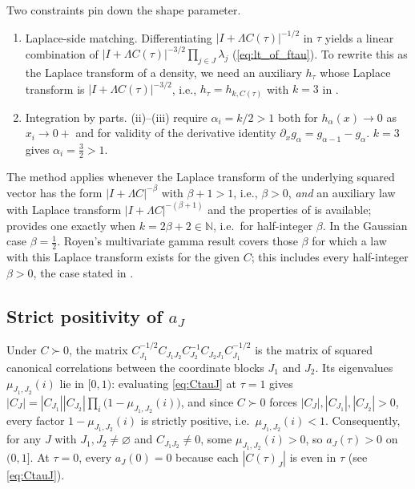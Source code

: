 \documentclass[12pt,a4paper]{article}
\theoremstyle{definition}
\begin{document}
Two constraints pin down the shape parameter.
\begin{enumerate}
  \item Laplace-side matching.  Differentiating
    $|I+\Lambda C(\tau)|^{-1/2}$ in $\tau$ yields a linear combination
    of $|I+\Lambda C(\tau)|^{-3/2}\prod_{j\in J}\lambda_j$
    (\eqref{eq:lt_of_ftau}).  To rewrite this as the Laplace transform
    of a density, we need an auxiliary $h_\tau$ whose Laplace
    transform is $|I+\Lambda C(\tau)|^{-3/2}$, i.e.,
    $h_\tau=h_{k,C(\tau)}$ with $k=3$ in .

  \item Integration by parts.  (ii)--(iii) require
    $\alpha_i=k/2>1$ both for $h_\alpha(x)\to 0$ as $x_i\to 0+$ and for
    validity of the derivative identity
    $\partial_xg_\alpha=g_{\alpha-1}-g_\alpha$.  $k=3$ gives
    $\alpha_i=\tfrac{3}{2}>1$.
\end{enumerate}

The method applies whenever the Laplace transform of the
underlying squared vector has the form $|I+\Lambda C|^{-\beta}$ with
$\beta+1>1$, i.e., $\beta>0$, \emph{and} an auxiliary law with Laplace
transform $|I+\Lambda C|^{-(\beta+1)}$ and the properties of
 is available;  provides one exactly when
$k=2\beta+2\in\mathbb{N}$, i.e.\ for half-integer $\beta$.  In the
Gaussian case $\beta=\tfrac{1}{2}$.
Royen's multivariate gamma result covers those $\beta$ for which a
law with this Laplace transform exists for the given $C$; this includes
every half-integer $\beta>0$, the case stated in .

\subsection{Strict positivity of \texorpdfstring{$a_J$}{a(J)}}\label{note:phase}

Under $C\succ 0$, the matrix
$C_{J_1}^{-1/2}C_{J_1J_2}C_{J_2}^{-1}C_{J_2J_1}C_{J_1}^{-1/2}$ is
the matrix of squared canonical correlations between the coordinate
blocks $J_1$ and $J_2$.  Its eigenvalues $\mu_{J_1,J_2}(i)$ lie in
$[0,1)$: evaluating \eqref{eq:CtauJ} at $\tau=1$ gives
$|C_J|=|C_{J_1}||C_{J_2}|\prod_i\bigl(1-\mu_{J_1,J_2}(i)\bigr)$, and since
$C\succ 0$ forces $|C_J|,|C_{J_1}|,|C_{J_2}|>0$, every factor
$1-\mu_{J_1,J_2}(i)$ is strictly positive, i.e.\ $\mu_{J_1,J_2}(i)<1$.
Consequently, for any $J$ with
$J_1,J_2\ne\varnothing$ and $C_{J_1J_2}\ne 0$, some $\mu_{J_1,J_2}(i)
>0$, so $a_J(\tau)>0$ on $(0,1]$.  At $\tau=0$, every $a_J(0)=0$
because each $|C(\tau)_J|$ is even in $\tau$ (see \eqref{eq:CtauJ}).
\end{document}
